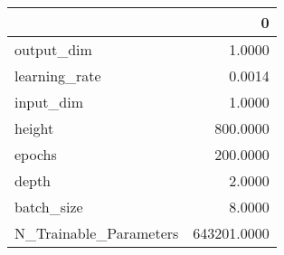 \begin{tabular}{lr}
\toprule
{} &            0 \\
\midrule
output\_dim             &       1.0000 \\
learning\_rate          &       0.0014 \\
input\_dim              &       1.0000 \\
height                 &     800.0000 \\
epochs                 &     200.0000 \\
depth                  &       2.0000 \\
batch\_size             &       8.0000 \\
N\_Trainable\_Parameters &  643201.0000 \\
\bottomrule
\end{tabular}
